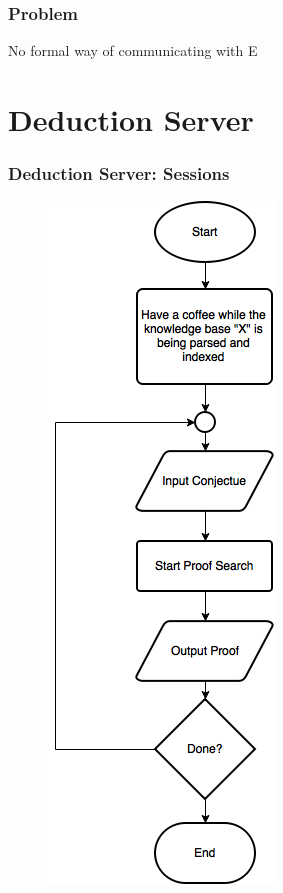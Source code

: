 \documentclass[10pt]{beamer}
\begin{document}
\begin{frame}[fragile]
  \frametitle{Problem}
  No formal way of communicating with E
\end{frame}

\section{Deduction Server}
\begin{frame}[fragile]
  \frametitle{Deduction Server: Sessions}
  \begin{figure} \includegraphics[width=\linewidth,height=0.9\textheight,keepaspectratio]{imgs/NewDeductionFC.png} \end{figure}
\end{frame}
\end{document}
